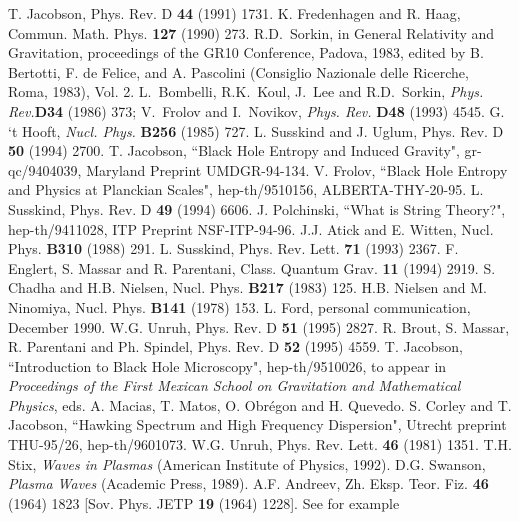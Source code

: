 \begin{thebibliography}{99}
T. Jacobson, {Phys. Rev. D} {\bf 44} (1991) 1731.
K. Fredenhagen and R. Haag, Commun. Math. Phys. {\bf 127}
(1990) 273.
R.D.~Sorkin, in General Relativity and Gravitation, proceedings 
of the GR10 Conference, Padova, 1983, edited by B. Bertotti, F. de Felice, and A. Pascolini (Consiglio Nazionale delle Ricerche, Roma, 1983), Vol. 2.
L.~Bombelli, R.K.~Koul, J.~Lee and R.D.~Sorkin, {\sl Phys. Rev.}{\bf D34} (1986) 373;
V.~Frolov and I.~Novikov, {\sl Phys. Rev.} {\bf D48} (1993) 4545.
G. `t Hooft, {\it Nucl. Phys.} {\bf B256} (1985) 727. 
L. Susskind and J. Uglum, Phys. Rev. D {\bf 50} (1994) 2700.
T. Jacobson, ``Black Hole Entropy and Induced Gravity",
gr-qc/9404039, Maryland Preprint UMDGR-94-134.
V. Frolov, ``Black Hole Entropy and Physics at Planckian Scales", hep-th/9510156, ALBERTA-THY-20-95.
L. Susskind, Phys. Rev. D {\bf 49} (1994) 6606.
J. Polchinski, ``What is String Theory?", hep-th/9411028,
ITP Preprint NSF-ITP-94-96.
J.J. Atick and E. Witten, Nucl. Phys. {\bf B310} (1988) 291.
L. Susskind, Phys. Rev. Lett. {\bf 71} (1993) 2367.
F. Englert, S. Massar and R. Parentani, Class. Quantum Grav.
{\bf 11} (1994) 2919.
S. Chadha and H.B. Nielsen, Nucl. Phys. {\bf B217} (1983) 125.
H.B. Nielsen and M. Ninomiya, Nucl. Phys. {\bf B141} (1978)
153.
L. Ford, personal communication, December 1990.
W.G. Unruh, {Phys. Rev. D} {\bf 51} (1995) 2827. 
R. Brout, S. Massar, R. Parentani and Ph. Spindel,
{Phys. Rev. D} {\bf 52} (1995) 4559.
T. Jacobson, ``Introduction to Black Hole Microscopy",
hep-th/9510026, to appear in {\it Proceedings of the First Mexican School
on Gravitation and Mathematical Physics}, eds. A. Macias, T. Matos, 
O. Obr\'egon and H. Quevedo.
S. Corley and T. Jacobson, ``Hawking Spectrum
and High Frequency Dispersion", Utrecht preprint THU-95/26, hep-th/9601073.
W.G. Unruh, {Phys. Rev. Lett.} {\bf 46} (1981) 1351.
T.H. Stix, {\it Waves in Plasmas} 
(American Institute of Physics, 1992).
D.G. Swanson, {\it Plasma Waves} (Academic Press, 1989).
A.F. Andreev, Zh. Eksp. Teor. Fiz. {\bf 46} (1964) 1823 [Sov. Phys. JETP {\bf 19} (1964) 1228].
See for example 

\end{thebibliography}
